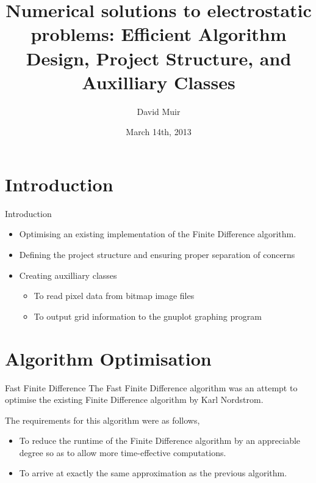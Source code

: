 \documentclass{beamer}
\title{Numerical solutions to electrostatic problems: Efficient Algorithm Design, Project Structure, and Auxilliary Classes}
\author{David Muir}
\institute{University of Glasgow}
\date{March 14th, 2013}
\begin{document}
{
\begin{frame}
  \titlepage
\end{frame}
\addtocounter{framenumber}{-1}

}

\section{Introduction}

\begin{frame}{Introduction}
    \begin{itemize}
        \item Optimising an existing implementation of the Finite Difference algorithm. 
        \item Defining the project structure and ensuring proper separation of concerns
        \item Creating auxilliary classes
            \begin{itemize}
                \item To read pixel data from bitmap image files
                \item To output grid information to the gnuplot graphing program
            \end{itemize}
    \end{itemize}
\end{frame}

\section{Algorithm Optimisation}

\begin{frame}{Fast Finite Difference}
    The Fast Finite Difference algorithm was an attempt to optimise the existing Finite Difference algorithm by Karl Nordstrom.

    The requirements for this algorithm were as follows,
    \begin{itemize}
        \item To reduce the runtime of the Finite Difference algorithm by an appreciable degree so as to allow more time-effective computations.
        \item To arrive at exactly the same approximation as the previous algorithm.
    \end{itemize}
\end{frame}
\end{document}
